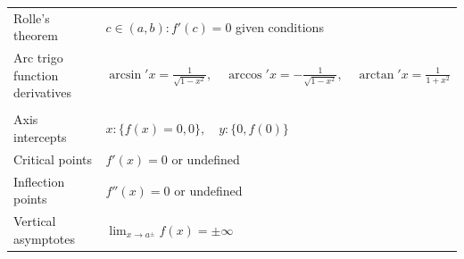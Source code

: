 \begin{landscape}
\begin{multicols*}{2}
\begin{tabularx}{\columnwidth}{@{}lX@{}}
            Rolle's theorem                     & $c\in(a,b):f'(c)=0$ given conditions                                                                                                                                                                                                                                                                                   \\
            Arc trigo function derivatives      & $\arcsin' x = \frac{1}{\sqrt{1-x^2}},\quad \arccos' x = -\frac{1}{\sqrt{1-x^2}},\quad \arctan' x = \frac{1}{1+x^2}$                                                                                                                                                                                                    \\
                                                &                                                                                                                                                                                                                                                                                                                        \\
            Axis intercepts                     & $x:\{f(x)=0,0\},\quad y:\{0,f(0)\}$                                                                                                                                                                                                                                                                                    \\
            Critical points                     & $f'(x)=0$ or undefined                                                                                                                                                                                                                                                                                                 \\
            Inflection points                   & $f''(x)=0$ or undefined                                                                                                                                                                                                                                                                                                \\
            Vertical asymptotes                 & $\lim_{x\to a^\pm}f(x)=\pm\infty$                                                                                                                                                                                                                                                                                      \\

\end{tabularx}
\end{multicols*}
\end{landscape}
